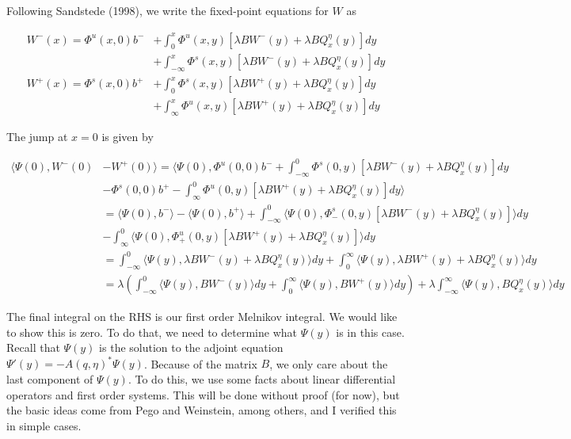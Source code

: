 \documentclass[12pt]{article}
\begin{document}
Following Sandstede (1998), we write the fixed-point equations for $W$ as 

\begin{align*}
W^-(x) = \Phi^u(x, 0)b^- &+ \int_0^x \Phi^u(x, y)[\lambda B W^-(y) + \lambda B Q^\eta_x(y) ] dy \\
&+ \int_{-\infty}^x \Phi^s(x, y)[\lambda B W^-(y) + \lambda B Q^\eta_x(y) ] dy \\
W^+(x) = \Phi^s(x, 0)b^+ &+ \int_0^x \Phi^s(x, y)[\lambda B W^+(y) + \lambda B Q^\eta_x(y) ] dy \\
&+ \int_{\infty}^x \Phi^u(x, y)[\lambda B W^+(y) + \lambda B Q^\eta_x(y) ] dy
\end{align*}

The jump at $x = 0$ is given by

\begin{align*}
\langle\Psi(0), W^-(0) &- W^+(0)\rangle = \langle \Psi(0), \Phi^u(0, 0)b^- + \int_{-\infty}^0 \Phi^s(0, y)[\lambda B W^-(y) + \lambda B Q^\eta_x(y) ] dy  \\
&- \Phi^s(0, 0)b^+ - \int_\infty^0 \Phi^u(0, y)[\lambda B W^+(y) + \lambda B Q^\eta_x(y) ] dy \rangle\\
&= \langle \Psi(0), b^- \rangle - \langle \Psi(0), b^+ \rangle + \int_{-\infty}^0 \langle \Psi(0), \Phi^s_-(0, y)[\lambda B W^-(y) + \lambda B Q^\eta_x(y) ] \rangle dy  \\
&- \int_\infty^0 \langle \Psi(0), \Phi^u_+(0, y)[\lambda B W^+(y) + \lambda B Q^\eta_x(y) ] \rangle dy  \\
&= \int_{-\infty}^0 \langle \Psi(y), \lambda B W^-(y) + \lambda B Q^\eta_x(y) \rangle dy 
+ \int_0^\infty \langle \Psi(y), \lambda B W^+(y) + \lambda B Q^\eta_x(y)  \rangle dy \\
&= \lambda\left( \int_{-\infty}^0 \langle \Psi(y), B W^-(y) \rangle dy + \int_0^\infty \langle \Psi(y), B W^+(y) \rangle dy \right) + \lambda \int_{-\infty}^\infty \langle\Psi(y), BQ^\eta_x(y) \rangle dy
\end{align*}

The final integral on the RHS is our first order Melnikov integral. We would like to show this is zero. To do that, we need to determine what $\Psi(y)$ is in this case. Recall that $\Psi(y)$ is the solution to the adjoint equation $\Psi'(y) = -A(q, \eta)^*\Psi(y)$. Because of the matrix $B$, we only care about the last component of $\Psi(y)$. To do this, we use some facts about linear differential operators and first order systems. This will be done without proof (for now), but the basic ideas come from Pego and Weinstein, among others, and I verified this in simple cases.\\
\end{document}
